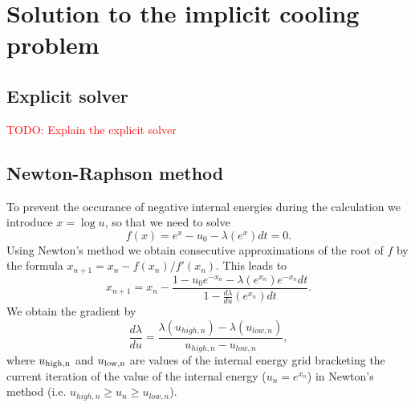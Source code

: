 \documentclass[fleqn, usenatbib, useAMS, a4paper]{mnras}
\newcommand{\todo}[1]{{\textcolor{red}{TODO: #1}\\}}
\newcommand{\D}[2]{\frac{d#1}{d#2}}
\begin{document}
\section{Solution to the implicit cooling problem}

\subsection{Explicit solver}

\todo{Explain the explicit solver}

\subsection{Newton-Raphson method}

To prevent the occurance of negative internal energies during the
calculation we introduce $x = \log u$, so that we need to solve
\begin{equation}\label{fx-eq}
f(x) = e^x - u_0 - \lambda(e^x) dt = 0.
\end{equation}
Using Newton's method we obtain consecutive approximations of the root
of $f$ by the formula $x_{n+1} = x_n - f(x_n)/f'(x_n)$. This leads to
\begin{equation}
x_{n+1} = x_n - \frac{1 - u_0 e^{-x_n} -\lambda(e^{x_n})e^{-x_n}dt}{1
  - \frac{d\lambda}{du}(e^{x_n}) dt}.
\end{equation}
We obtain the gradient by
\begin{equation}
  \D \lambda u = \frac{\lambda(u_{high,n})
    - \lambda(u_{low,n})}{u_{high,n} - u_{low,n}},
\end{equation}
where $u_{\rm high,n}$ and $ u_{\rm low,n}$ are values of the internal
energy grid bracketing the current iteration of the value of the
internal energy ($u_n = e^{x_n}$) in Newton's method (i.e. $u_{high,n}
\ge u_n \ge u_{low,n}$).

\end{document}
